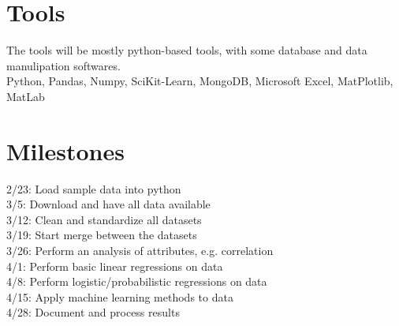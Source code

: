\documentclass[sigconf, 11pt]{acmart}
\begin{document}
\newpage
\section{Tools}
The tools will be mostly python-based tools, with some database and data manulipation softwares. \\
Python, Pandas, Numpy, SciKit-Learn, MongoDB, 
Microsoft Excel, MatPlotlib, MatLab \\


\section{Milestones}
2/23: Load sample data into python \\
3/5: Download and have all data available \\
3/12: Clean and standardize all datasets \\
3/19: Start merge between the datasets \\
3/26: Perform an analysis of attributes, e.g. correlation \\
4/1: Perform basic linear regressions on data \\
4/8: Perform logistic/probabilistic regressions on data \\
4/15: Apply machine learning methods to data \\
4/28: Document and process results \\


\end{document}
